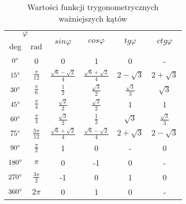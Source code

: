     \begin{table}[h!]
        \centering
        \caption{Wartości funkcji trygonometrycznych ważniejszych kątów}
        \label{tab:wartosci_tryg}
        \vspace{3mm}
        \begin{tabular}{cccccc}
            \multicolumn{2}{c}{$\varphi$} & \multirow{2}{*}{$sin\varphi$} & \multirow{2}{*}{$cos\varphi$} & \multirow{2}{*}{$tg\varphi$} & \multirow{2}{*}{$ctg\varphi$} \\
            deg & rad & & & &\\
            \midrule
            $0\degree$ & 0 & 0 & 1 & 0 & -\\
            $15\degree$ & $\frac{\pi}{12}$ & $\frac{\sqrt{6}-\sqrt{2}}{4}$ & $\frac{\sqrt{6}+\sqrt{2}}{4}$ & $2-\sqrt{3}$ & $2+\sqrt{3}$\\
            $30\degree$ & $\frac{\pi}{6}$ & $\frac{1}{2}$ & $\frac{\sqrt{3}}{2}$ & $\frac{\sqrt{3}}{3}$ & $\sqrt{3}$\\
            $45\degree$ & $\frac{\pi}{4}$ & $\frac{\sqrt{2}}{2}$ & $\frac{\sqrt{2}}{2}$ & $1$ & $1$\\
            $60\degree$ & $\frac{\pi}{3}$ & $\frac{\sqrt{3}}{2}$ & $\frac{1}{2}$ & $\sqrt{3}$ & $\frac{\sqrt{3}}{3}$\\
            $75\degree$ & $\frac{5\pi}{12}$ & $\frac{\sqrt{6}+\sqrt{2}}{4}$ & $\frac{\sqrt{6}-\sqrt{2}}{4}$ & $2+\sqrt{3}$ & $2-\sqrt{3}$\\
            $90\degree$ & $\frac{\pi}{2}$ & 1 & 0 & - & 0\\
            $180\degree$ & $\pi$ & 0 & -1 & 0 & -\\
            $270\degree$ & $\frac{3\pi}{2}$ & -1 & 0 & 1 & 0\\
            $360\degree$ & $2\pi$ & 0 & 1 & 0 & -\\
            \bottomrule
        \end{tabular}
    \end{table}

\renewcommand{\arraystretch}{1}
